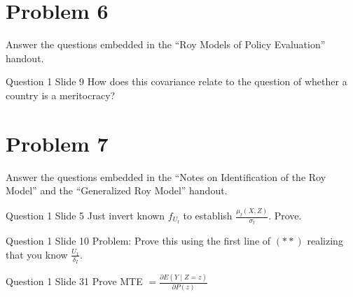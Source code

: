 \documentclass{article}
\begin{document}
\newpage

\section*{Problem 6}
Answer the questions embedded in the ``Roy Models of Policy Evaluation'' handout.

\begin{problem}{Question 1 Slide 9} How does this covariance relate to the question of whether a country is a meritocracy?
\end{problem}
\begin{solution}
\end{solution}


\newpage

\section*{Problem 7}
Answer the questions embedded in the ``Notes on Identification of the Roy Model'' and the ``Generalized Roy Model'' handout.

\begin{problem}{Question 1 Slide 5}
Just invert known $f_{U_{l}}$ to establish $\frac{\mu_{l}(X, Z)}{\sigma_{l}}$. Prove.
\end{problem}
\begin{solution}
\end{solution}

\begin{problem}{Question 1 Slide 10}
Problem: Prove this using the first line of $(* *)$ realizing that you know $\frac{U_{1}}{\delta_{I}}$.
\end{problem}
\begin{solution}
\end{solution}

\begin{problem}{Question 1 Slide 31}
Prove MTE $=\frac{\partial E(Y \mid Z=z)}{\partial P(z)}$
\end{problem}
\begin{solution}
\end{solution}

\newpage
\end{document}
